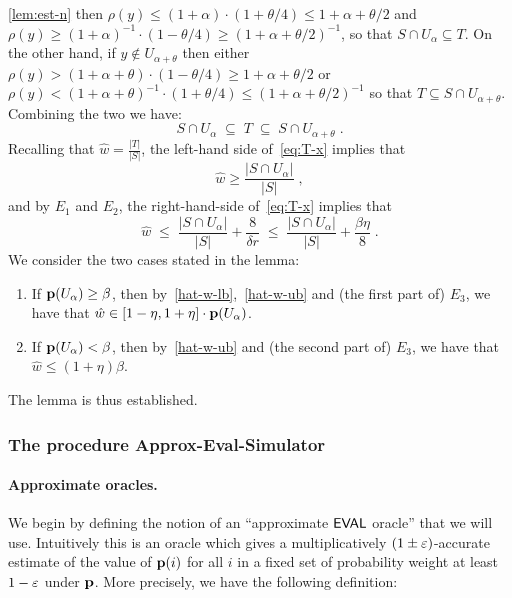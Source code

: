 \begin{proofof}{\cref{lem:est-n}}
then $\rho(y) \leq (1+\alpha)\cdot(1+\theta/4) \leq 1+\alpha+\theta/2$
and $\rho(y) \geq (1+\alpha)^{-1}\cdot (1-\theta/4)
   \geq (1+\alpha+\theta/2)^{-1}$,
so that $S\cap U_{\alpha} \subseteq T$.
On the other hand, if $y \notin U_{\alpha+\theta}$
then either
$\rho(y) > (1+\alpha+\theta)\cdot(1-\theta/4) \geq 1+\alpha+\theta/2$
or $\rho(y) < (1+\alpha+\theta)^{-1}\cdot(1+\theta/4)
    \leq (1+\alpha+\theta/2)^{-1}$
so that $T \subseteq S\cap U_{\alpha+\theta}$.
Combining the two we have:
\begin{equation} \label{eq:T-x}
S\cap U_{\alpha} \;\subseteq \;T\;\subseteq\;
              S\cap U_{\alpha+\theta}\;.
\end{equation}
Recalling that $\hat{w} = \frac{|T|}{|S|}$,
the left-hand side of~\cref{eq:T-x} implies that
\begin{equation}\label{hat-w-lb}
\hat{w} \geq \frac{|S\cap U_{\alpha}|}{|S|}\;,
\end{equation}
and by $E_1$ and $E_2$, the right-hand-side of~\cref{eq:T-x} implies that
\begin{equation}\label{hat-w-ub}
\hat{w}
 \;\leq\; \frac{|S\cap U_{\alpha}|}{|S|}
       + \frac{8}{\delta r} \;\leq\;
       \frac{|S\cap U_{\alpha}|}{|S|}
              + \frac{\beta\eta}{8}\;.
\end{equation}
We consider the two cases stated in the lemma:
\begin{enumerate}
\item If $\mathbf{p}(U_{\alpha}) \geq \beta$,
then by~\cref{hat-w-lb},~\cref{hat-w-ub} and (the first
part of) $E_3$, we have that
$\hat{w} \in [1-\eta,1+\eta]\cdot \mathbf{p}(U_{\alpha})$.
\item If $\mathbf{p}(U_\alpha) < \beta$, then by~\cref{hat-w-ub} and (the second
part of) $E_3$, we have that $\hat{w} \leq (1+\eta)\beta$.
\end{enumerate}
The lemma is thus established.
\end{proofof}

\subsubsection{The procedure {\sc Approx-Eval-Simulator}}\label{subsec:approx-eval}

\paragraph{Approximate \EVAL oracles.}

We begin by defining the notion of an ``approximate ${\sf EVAL}$ oracle''
that we will use.  Intuitively this is an oracle which gives
a multiplicatively $(1 \pm  \varepsilon)$-accurate estimate of
the value of $\mathbf{p}(i)$ for
all $i$ in a fixed set of probability weight at least $1-\varepsilon$
under $\mathbf{p}$.
More precisely, we have the following definition:

